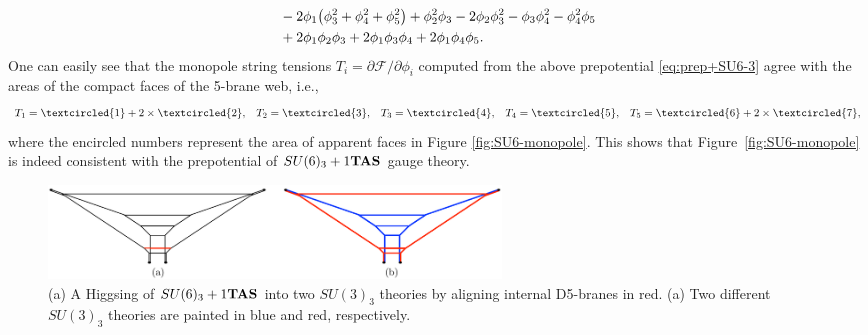 \documentclass[letterpaper, 11pt]{article}
\begin{document}
{\begin{align}
\begin{split}
   &  \quad -2\phi_1 \big(\phi_3^2+\phi_4^2+\phi_5^2\big) +\phi_2^2 \phi_3-2 \phi_2 \phi_3^2-\phi_3 \phi_4^2-\phi _4^2 \phi_5 \cr 
   & \quad +2 \phi _1\phi _2 \phi _3 +2\phi_1\phi_3\phi_4+2\phi_1\phi_4\phi_5. \label{eq:prep+SU6-3}
\end{split}
\end{align}
One can easily see that the monopole string tensions $T_i=\partial{\mathcal{F}}/\partial{\phi_i}$ computed from the above prepotential \eqref{eq:prep+SU6-3} agree with the areas of the compact faces of the 5-brane web, i.e.,
\begin{align}
T_1=\textcircled{\scriptsize 1} + 2\times\textcircled{\scriptsize 2},  %
&& T_2=\textcircled{\scriptsize 3}, %
&&T_3=\textcircled{\scriptsize 4}, %
&&T_4=\textcircled{\scriptsize 5}, %
&&T_5=\textcircled{\scriptsize 6} 
	+ 2\times\textcircled{\scriptsize 7},
\end{align}
where the encircled numbers represent the area of apparent faces in Figure \ref{fig:SU6-monopole}. This shows that Figure~\ref{fig:SU6-monopole} is indeed consistent with the prepotential of $SU(6)_3+1{\bf TAS}$ gauge theory.

\begin{figure}[t]
\centering
\includegraphics[width=12cm]{SU6-Higgsing.pdf}
\caption{(a) A Higgsing of $SU(6)_3+1{\bf TAS}$ into two $SU(3)_3$ theories by aligning internal D5-branes in red. (a) Two different $SU(3)_3$ theories are painted in blue and red, respectively. %
}
\label{fig:SU6-Higgsing}
\end{figure}
 
}
\end{document}
